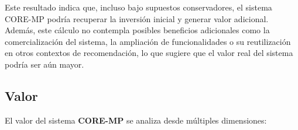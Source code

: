 Este resultado indica que, incluso bajo supuestos conservadores, el sistema 
CORE-MP podría recuperar la inversión inicial y generar valor adicional. 
Además, este cálculo no contempla posibles beneficios adicionales como la 
comercialización del sistema, la ampliación de funcionalidades o su reutilización 
en otros contextos de recomendación, lo que sugiere que el valor real del sistema 
podría ser aún mayor.





\subsection{Valor}

El valor del sistema \textbf{CORE-MP} se analiza desde múltiples dimensiones:


